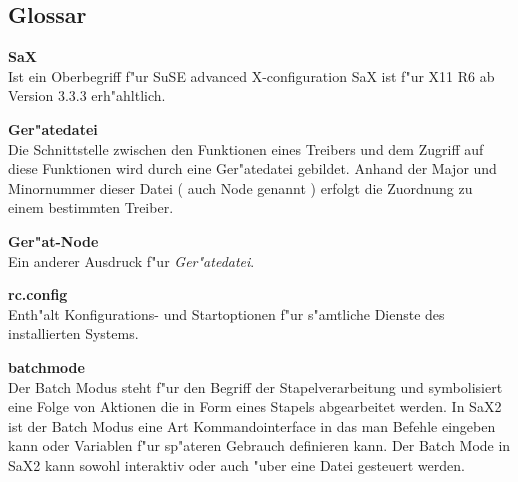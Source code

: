 \begin{twocolumn}
\setcounter{secnumdepth}{-1}
\chapter{Glossar}

\begin{description}

\begin{small}
\item {\textbf{SaX}\\} {
  Ist ein Oberbegriff f"ur SuSE advanced X-configuration
  SaX ist f"ur X11 R6 ab Version 3.3.3 erh"ahltlich.
}

\item {\textbf{Ger"atedatei}\\} {
  Die Schnittstelle zwischen den Funktionen eines Treibers
  und dem Zugriff auf diese \linebreak Funktionen wird durch eine
  Ger"atedatei gebildet. Anhand der Major und Minornummer
  dieser Datei ( auch Node genannt ) erfolgt die Zuordnung 
  zu einem bestimmten Treiber. 
}

\item {\textbf{Ger"at-Node}\\} {
  Ein anderer Ausdruck f"ur \textit{Ger"atedatei}.
}

\item {\textbf{rc.config}\\} {
  Enth"alt Konfigurations- und Startoptionen f"ur s"amtliche Dienste
  des installierten Systems. 
}

\item {\textbf{batchmode}\\} {
  Der Batch Modus steht f"ur den Begriff der Stapelverarbeitung 
  und symbolisiert eine Folge von Aktionen die in Form eines
  Stapels abgearbeitet werden. In SaX2 ist der Batch Modus eine
  Art Kommandointerface in das man Befehle eingeben kann oder 
  Variablen f"ur sp"ateren Gebrauch definieren kann. Der Batch 
  Mode in SaX2 kann sowohl interaktiv oder auch "uber eine Datei
  gesteuert werden. 
}

\end{small}
\end{description}
\end{twocolumn}


\onecolumn

